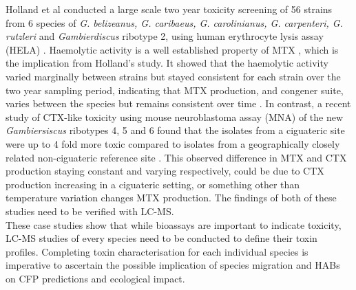 \documentclass[12pt]{article}
\begin{document}
Holland et al conducted a large scale two year toxicity screening of 56 strains from 6 species of \emph{G. belizeanus, G. caribaeus, G. carolinianus, G. carpenteri, G. rutzleri} and  \emph{Gambierdiscus} ribotype 2, using human erythrocyte lysis assay (HELA) \cite{holland2013differences}. Haemolytic activity is a well established property of MTX \cite{igarashi1999mechanisms}, which is the implication from Holland's study. It showed that the haemolytic activity varied marginally between strains but stayed consistent for each strain over the two year sampling period, indicating that MTX production, and congener suite, varies between the species but remains consistent over time \cite{holland2013differences}.
In contrast, a recent study of CTX-like toxicity using mouse neuroblastoma assay (MNA) of the new \emph{Gambiersiscus} ribotypes 4, 5 and 6 found that the isolates from a ciguateric site were up to 4\- fold more toxic compared to isolates from a geographically closely related non-ciguateric reference site \cite{xu2014distribution}. This observed difference in MTX and CTX production staying constant and varying respectively, could be due to CTX production increasing in a ciguateric setting, or something other than temperature variation changes MTX production. The findings of both of these studies need to be verified with LC-MS. \\
These case studies show that while bioassays are important to indicate toxicity, LC-MS studies of every species need to be conducted to define their toxin profiles. Completing toxin characterisation for each individual species is imperative to ascertain the possible implication of species migration and HABs on CFP predictions and ecological impact. 
\end{document}
